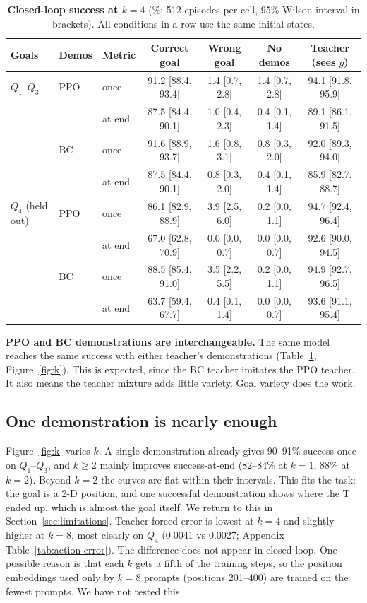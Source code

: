 \begin{table}[h]
\centering
\caption{\textbf{Closed-loop success at $k = 4$} (\%; 512 episodes per cell, 95\% Wilson interval in brackets). All conditions in
a row use the same initial states.}
\label{tab:main}
\small
\begin{tabular}{lllcccc}
\toprule
Goals & Demos & Metric & Correct goal & Wrong goal & No demos & Teacher (sees $g$) \\
\midrule
$Q_1$--$Q_3$ & PPO & once   & 91.2 [88.4, 93.4] & 1.4 [0.7, 2.8] & 1.4 [0.7, 2.8] & 94.1 [91.8, 95.9] \\
             &     & at end & 87.5 [84.4, 90.1] & 1.0 [0.4, 2.3] & 0.4 [0.1, 1.4] & 89.1 [86.1, 91.5] \\
             & BC  & once   & 91.6 [88.9, 93.7] & 1.6 [0.8, 3.1] & 0.8 [0.3, 2.0] & 92.0 [89.3, 94.0] \\
             &     & at end & 87.5 [84.4, 90.1] & 0.8 [0.3, 2.0] & 0.4 [0.1, 1.4] & 85.9 [82.7, 88.7] \\
\midrule
$Q_4$ (held out) & PPO & once   & 86.1 [82.9, 88.9] & 3.9 [2.5, 6.0] & 0.2 [0.0, 1.1] & 94.7 [92.4, 96.4] \\
                 &     & at end & 67.0 [62.8, 70.9] & 0.0 [0.0, 0.7] & 0.0 [0.0, 0.7] & 92.6 [90.0, 94.5] \\
                 & BC  & once   & 88.5 [85.4, 91.0] & 3.5 [2.2, 5.5] & 0.2 [0.0, 1.1] & 94.9 [92.7, 96.5] \\
                 &     & at end & 63.7 [59.4, 67.7] & 0.4 [0.1, 1.4] & 0.0 [0.0, 0.7] & 93.6 [91.1, 95.4] \\
\bottomrule
\end{tabular}
\end{table}

\textbf{PPO and BC demonstrations are interchangeable.} The same model reaches the same success with either teacher's demonstrations
(Table~\ref{tab:main}, Figure~\ref{fig:k}). This is expected, since the BC teacher imitates the PPO teacher. It also means the teacher
mixture adds little variety. Goal variety does the work.

\subsection{One demonstration is nearly enough}
Figure~\ref{fig:k} varies $k$. A single demonstration already gives 90--91\% success-once on $Q_1$--$Q_3$, and $k \ge 2$ mainly
improves success-at-end (82--84\% at $k = 1$, 88\% at $k = 2$). Beyond $k = 2$ the curves are flat within their intervals. This fits
the task: the goal is a 2-D position, and one successful demonstration shows where the T ended up, which is almost the goal itself.
We return to this in Section~\ref{sec:limitations}.
Teacher-forced error is lowest at $k = 4$ and slightly higher at $k = 8$, most clearly on $Q_4$ (0.0041 vs 0.0027;
Appendix Table~\ref{tab:action-error}). The difference does not appear in closed loop. One possible reason is that each $k$ gets a
fifth of the training steps, so the position embeddings used only by $k = 8$ prompts (positions 201--400) are trained on the fewest
prompts. We have not tested this.

